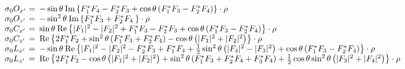 \documentclass[a4paper,10pt]{article}
\def\cc{^*}
\def\Re{\mathrm{Re}}
\def\Im{\mathrm{Im}}
\begin{document}
\begin{displaymath}\label{frm_Obs2}
\begin{array}{lcl}
\sigma_0 O_{x^\prime} &\hspace{-0.67em}=&\hspace{-0.5em} -\sin\theta \:\Im \left\lbrace F_1\cc F_4 - F_2\cc F_3
                                                      + \cos\theta\left(F_1\cc F_3 - F_2\cc F_4\right)
                                                       \right\rbrace \cdot \rho\\
\sigma_0 O_{z^\prime} &\hspace{-0.67em}=&\hspace{-0.5em} -\sin^2\theta \:\Im \left\lbrace F_1\cc F_3 + F_2\cc F_4\:
                                                       \right\rbrace \cdot \rho\\
\sigma_0 C_{x^\prime} &\hspace{-0.67em}=&\hspace{-0.5em} \sin\theta \:\Re \left\lbrace |F_1|^2 - |F_2|^2 
                                                      + F_1\cc F_3 - F_2\cc F_3 
                                                      +\cos\theta\left(F_1\cc F_3 - F_2\cc F_4\right)
                                                       \right\rbrace \cdot \rho\\
\sigma_0 C_{z^\prime} &\hspace{-0.67em}=&\hspace{-0.5em} \Re \left\lbrace 2 F_1\cc F_2 
                                                      +\sin^2\theta\left(F_1\cc F_3 + F_2\cc F_4\right)
                                                      -\cos\theta\left(|F_1|^2+|F_2|^2\right)
                                                       \right\rbrace \cdot \rho\\
\sigma_0 L_{x^\prime} &\hspace{-0.67em}=&\hspace{-0.5em} -\sin\theta \:\Re\left\lbrace |F_1|^2 - |F_2|^2 - F_2\cc F_3  + F_1\cc F_4
                            + \frac{1}{2}\sin^2\theta \left( |F_4|^2 - |F_3|^2\right) 
                            + \cos\theta \left(F_1\cc F_3 - F_2\cc F_4\right) \right\rbrace \cdot \rho\\
\sigma_0 L_{z^\prime} &\hspace{-0.67em}=&\hspace{-0.5em} \Re\left\lbrace 2F_1\cc F_2 - \cos\theta\left(|F_1|^2  + |F_2|^2\right)
                             + \sin^2\theta\left(F_1\cc F_3 + F_2\cc F_4 + F_3\cc F_4\right)
                             + \frac{1}{2}\cos\theta\sin^2\theta\left(|F_3|^2 + |F_4|^2\right) \right\rbrace \cdot \rho\\

\end{array}
\end{displaymath}
\end{document}
